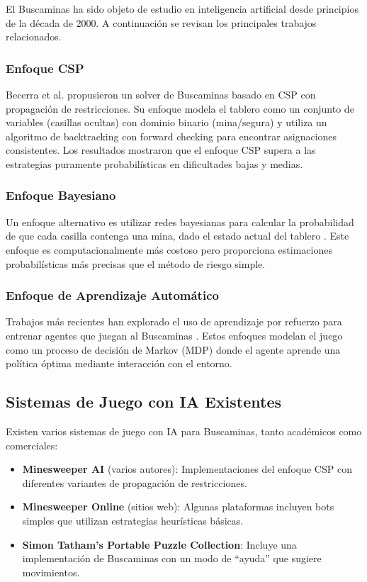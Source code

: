 \documentclass[12pt,a4paper]{article}
\begin{document}
El Buscaminas ha sido objeto de estudio en inteligencia artificial desde principios de la década de 2000. A continuación se revisan los principales trabajos relacionados.

\subsubsection{Enfoque CSP}

Becerra et al. \cite{beck2008minesweeper} propusieron un solver de Buscaminas basado en CSP con propagación de restricciones. Su enfoque modela el tablero como un conjunto de variables (casillas ocultas) con dominio binario (mina/segura) y utiliza un algoritmo de backtracking con forward checking para encontrar asignaciones consistentes. Los resultados mostraron que el enfoque CSP supera a las estrategias puramente probabilísticas en dificultades bajas y medias.

\subsubsection{Enfoque Bayesiano}

Un enfoque alternativo es utilizar redes bayesianas para calcular la probabilidad de que cada casilla contenga una mina, dado el estado actual del tablero \cite{percus2002minesweeper}. Este enfoque es computacionalmente más costoso pero proporciona estimaciones probabilísticas más precisas que el método de riesgo simple.

\subsubsection{Enfoque de Aprendizaje Automático}

Trabajos más recientes han explorado el uso de aprendizaje por refuerzo para entrenar agentes que juegan al Buscaminas \cite{deshpande2019minesweeper}. Estos enfoques modelan el juego como un proceso de decisión de Markov (MDP) donde el agente aprende una política óptima mediante interacción con el entorno.

\subsection{Sistemas de Juego con IA Existentes}

Existen varios sistemas de juego con IA para Buscaminas, tanto académicos como comerciales:

\begin{itemize}[itemsep=2pt]
    \item \textbf{Minesweeper AI} (varios autores): Implementaciones del enfoque CSP con diferentes variantes de propagación de restricciones.
    \item \textbf{Minesweeper Online} (sitios web): Algunas plataformas incluyen bots simples que utilizan estrategias heurísticas básicas.
    \item \textbf{Simon Tatham's Portable Puzzle Collection}: Incluye una implementación de Buscaminas con un modo de ``ayuda'' que sugiere movimientos.
\end{itemize}
\end{document}
